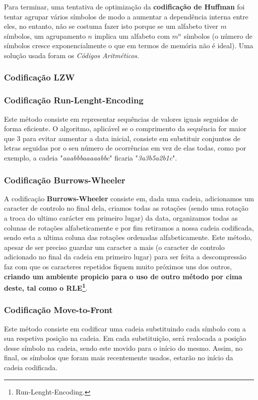 \documentclass[11pt,journal,compsoc]{IEEEtran}
\begin{document}
Para terminar, uma tentativa de optimização da \textbf{codificação de Huffman} foi tentar agrupar vários símbolos de modo a aumentar a dependência interna entre eles, no entanto, não se costuma fazer isto porque se um alfabeto tiver $m$ símbolos, um agrupamento $n$ implica um alfabeto com $m^n$ símbolos (o número de símbolos cresce exponencialmente o que em termos de memória não é ideal). Uma solução usada foram os \textit{Códigos Aritméticos}. %


\subsubsection{Codificação \textbf{LZW}}



\subsubsection{Codificação \textbf{Run-Lenght-Encoding}}
Este método consiste em representar sequências de valores iguais seguidos de forma eficiente. O algoritmo, aplicável se o comprimento da sequência for maior que 3 para evitar aumentar a data inicial, consiste em substituir conjuntos de letras seguidas por o seu número de ocorrências em vez de elas todas, como por exemplo, a cadeia "\textit{aaabbbaaaaabbc}" ficaria "\textit{3a3b5a2b1c}".


\subsubsection{Codificação \textbf{Burrows-Wheeler}}
A codificação \textbf{Burrows-Wheeler} consiste em, dada uma cadeia, adicionamos um caracter de controlo no final dela, criamos todas as rotações (sendo uma rotação a troca do ultimo carácter em primeiro lugar) da data, organizamos todas as colunas de rotações alfabeticamente e por fim retiramos a nossa cadeia codificada, sendo esta a ultima coluna das rotações ordenadas alfabeticamente.
Este método, apesar de ser preciso guardar um caracter a mais (o caracter de controlo adicionado no final da cadeia em primeiro lugar) para ser feita a descompressão faz com que os caracteres repetidos fiquem muito próximos uns dos outros, \textbf{criando um ambiente propicio para o uso de outro método por cima deste, tal como o  RLE\footnote{Run-Lenght-Encoding.}}.



\subsubsection{Codificação Move-to-Front}
Este método consiste em codificar uma cadeia substituindo cada símbolo com a sua respetiva posição na cadeia. Em cada substituição, será realocada a posição desse símbolo na cadeia, sendo este movido para o início do mesmo. Assim, no final, os símbolos que foram mais recentemente usados, estarão no início da cadeia codificada.
\end{document}
